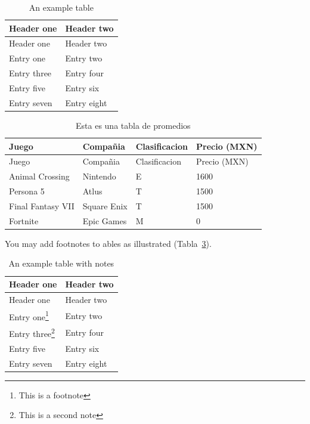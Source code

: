 \documentclass[
  12pt,
  letterpaper,
  DIV=11,
  numbers=noendperiod,
  oneside]{scrreport}
\begin{document}
\hypertarget{tbl-example}{}
\begin{longtable}[]{@{}ll@{}}
\caption{\label{tbl-example}An example table}\tabularnewline
\toprule()
Header one & Header two \\
\midrule()
\endfirsthead
\toprule()
Header one & Header two \\
\midrule()
\endhead
Entry one & Entry two \\
Entry three & Entry four \\
Entry five & Entry six \\
Entry seven & Entry eight \\
\bottomrule()
\end{longtable}

\hypertarget{tbl-los_promedios}{}
\begin{longtable}[]{@{}llll@{}}
\caption{\label{tbl-los_promedios}Esta es una tabla de
promedios}\tabularnewline
\toprule()
Juego & Compañia & Clasificacion & Precio (MXN) \\
\midrule()
\endfirsthead
\toprule()
Juego & Compañia & Clasificacion & Precio (MXN) \\
\midrule()
\endhead
Animal Crossing & Nintendo & E & 1600 \\
Persona 5 & Atlus & T & 1500 \\
Final Fantasy VII & Square Enix & T & 1500 \\
Fortnite & Epic Games & M & 0 \\
\bottomrule()
\end{longtable}

You may add footnotes to ables as illustrated (Tabla~\ref{tbl-notes}).

\hypertarget{tbl-notes}{}
\begin{longtable}[]{@{}ll@{}}
\caption{\label{tbl-notes}An example table with notes}\tabularnewline
\toprule()
Header one & Header two \\
\midrule()
\endfirsthead
\toprule()
Header one & Header two \\
\midrule()
\endhead
Entry one\footnote{This is a footnote} & Entry two \\
Entry three\footnote{This is a second note} & Entry four \\
Entry five & Entry six \\
Entry seven & Entry eight \\
\bottomrule()
\end{longtable}
\end{document}
